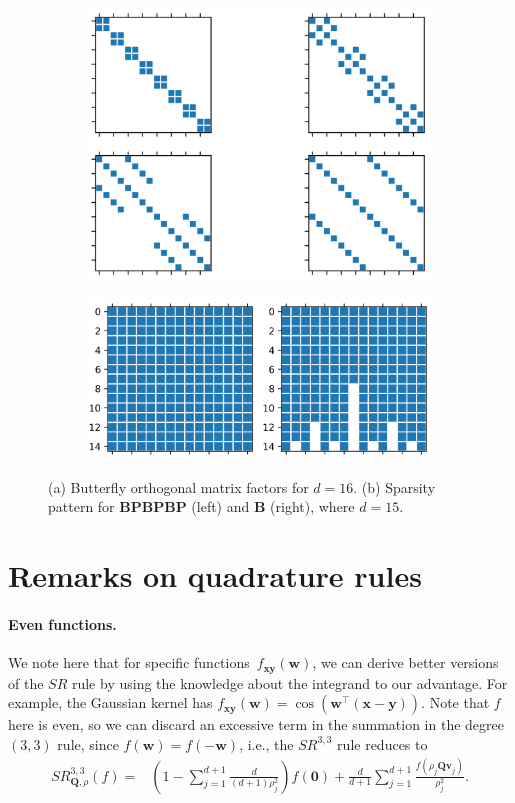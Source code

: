 \begin{figure}[t]
\begin{subfigure}[t]{.5\textwidth}
\centering
\includegraphics[width=0.575\linewidth]{figures/quadratures/b16.png}
\caption{}
\label{fig:factors}
\end{subfigure}
\hfill
\begin{subfigure}[t]{.5\textwidth}
\centering
\includegraphics[width=\linewidth]{figures/quadratures/rvsr.png}
\caption{}
\label{fig:sparsity}
\end{subfigure}
\caption{(a) Butterfly orthogonal matrix factors for ${d = 16}$. (b) Sparsity pattern for $\mathbf{BPBPBP}$ (left) and $\mathbf{B}$ (right), where $d=15$.}
\end{figure}


\section{Remarks on quadrature rules}
\paragraph*{Even functions.}
We note here that for specific functions~$f_{\mathbf{xy}}(\mathbf{w})$, we can derive better versions of the $SR$ rule by using the knowledge about the integrand to our advantage.
For example, the Gaussian kernel has ${f_{\mathbf{xy}}(\mathbf{w}) =
\cos(\mathbf{w}^{\boldsymbol{\top}}(\mathbf{x} - \mathbf{y}))}$.
Note that $f$ here is even, so we can discard an excessive term in the summation in the degree $(3, 3)$ rule, since $f(\mathbf{w}) = f(-\mathbf{w})$, i.e., the $SR^{3,3}$ rule reduces to
\begin{equation}
\begin{split}
\label{eq:sr33reduced}
SR^{3,3}_{\mathbf{Q}, \rho}(f) = &\left (1 - \sum_{j=1}^{d + 1}\frac{d}{(d + 1)\rho_j^2} \right )f(\mathbf{0}) + \frac{d}{d+1}\sum\limits_{j=1}^{d+1} \frac{f(\rho_j \mathbf{Qv}_j)}{\rho_j^2}.
\end{split}
\end{equation}

